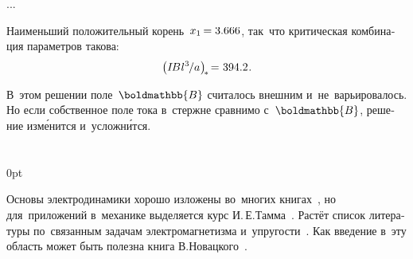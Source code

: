 \begin{otherlanguage}{russian}
...


\noindent Наименьший положительный корень~${x_1 \hspace{-0.2ex} = 3.666}$, так~что критическая комбинация параметров такова:
\[
\left( I \hspace{-0.25ex} B \hspace{.1ex} {l^3} \hspace{-0.2ex} / a \hspace{.1ex} \right)_{\hspace{-0.32ex}*} \hspace{-0.32ex} = \hspace{.1ex} 394.2 \hspace{.12ex}.
\]

В~этом решении поле~$\boldmathbb{B}$ считалось внешним и~не~варьировалось. Но если собственное поле тока в~стержне сравнимо с~$\boldmathbb{B}$, решение изм\'{е}нится и~усложн\'{и}тся.

\end{otherlanguage}

\section*{\small \wordforbibliography}

\begin{changemargin}{\parindent}{0pt}
\fontsize{10}{12}\selectfont

\begin{otherlanguage}{russian}

Основы электродинамики хорошо изложены во~многих книгах~\cite{classicalelectrodynamics, feynman-lecturesonphysics}, но для~приложений в~механике выделяется курс И.\,Е.\;Тамма~\cite{tamm-electricity}. Растёт список литературы по~связанным задачам электромагнетизма и~упругости~\cite{parton-electromagneticelasticity, podstrigach.burak.kondrat-magnetothermoelasticity}. Как введение в~эту область может быть полезна книга В.\;Новацкого~\cite{nowacki-electromagneticeffects}.

\end{otherlanguage}

\end{changemargin}
